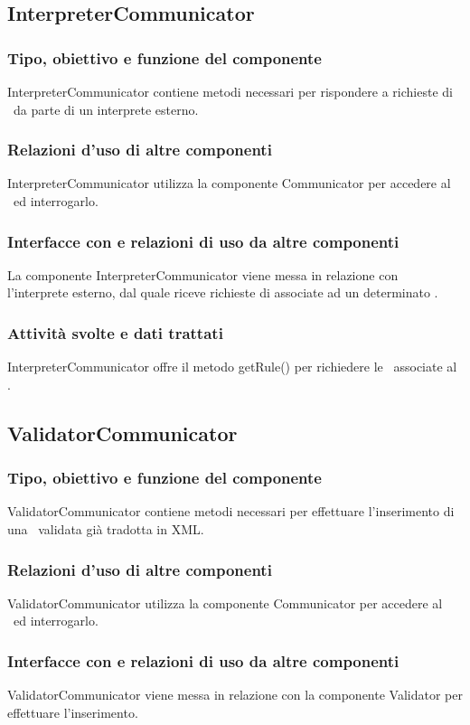 \documentclass[11pt,titlepage,a4paper]{report}
\begin{document}
\subsection{InterpreterCommunicator}
\subsubsection{Tipo, obiettivo e funzione del componente}
InterpreterCommunicator contiene metodi necessari per rispondere a richieste di \br\ da parte di un interprete esterno.
\subsubsection{Relazioni d'uso di altre componenti}
InterpreterCommunicator utilizza la componente Communicator per accedere al \re\ ed interrogarlo.
\subsubsection{Interfacce con e relazioni di uso da altre componenti}
La componente InterpreterCommunicator viene messa in relazione con l'interprete esterno, dal quale riceve richieste di \brs associate ad un determinato \bo.
\subsubsection{Attivit\`a svolte e dati trattati}
InterpreterCommunicator offre il metodo getRule() per richiedere le \br\ associate al \bo.

\subsection{ValidatorCommunicator}
\subsubsection{Tipo, obiettivo e funzione del componente}
ValidatorCommunicator contiene metodi necessari per effettuare l'inserimento di una \br\ validata gi\`a tradotta in XML.
\subsubsection{Relazioni d'uso di altre componenti}
ValidatorCommunicator utilizza la componente Communicator per accedere al \re\ ed interrogarlo.
\subsubsection{Interfacce con e relazioni di uso da altre componenti}
ValidatorCommunicator viene messa in relazione con la componente Validator per effettuare l'inserimento.
\end{document}
